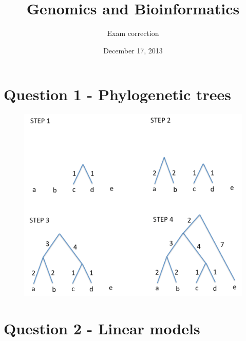 \documentclass[a4paper,11pt]{article}
\title{Genomics and Bioinformatics}
\date{December 17, 2013}
\author{Exam correction}
\begin{document}
\maketitle

\section*{Question 1 - Phylogenetic trees}

\begin{figure}[h!]
\centering\includegraphics[width=14cm]{UPGMA.png}
\end{figure}

\section*{Question 2 - Linear models}
\end{document}

